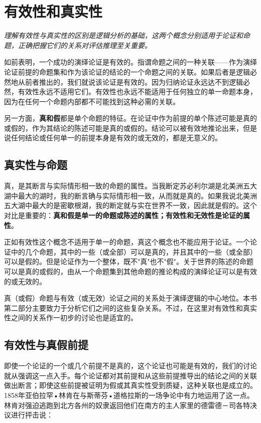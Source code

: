 \section{有效性和真实性}

\begin{logicbox}[title=引言]
\textit{理解有效性与真实性的区别是逻辑分析的基础，这两个概念分别适用于论证和命题，正确把握它们的关系对评估推理至关重要。}
\end{logicbox}

如前表明，一个成功的演绎论证是有效的。指谓命题之间的一种关联——作为演绎论证前提的命题集和作为该论证的结论的一个命题之间的关联。如果后者是逻辑必然地从前者推出的，我们就说该论证是有效的。因为归纳论证永远达不到逻辑必然，有效性永远不适用它们。有效性也永远不能适用于任何独立的单一命题本身，因为在任何一个命题内部都不可能找到这种必需的关联。

另一方面，\textbf{真和假}都是单个命题的特征。在论证中作为前提的单个陈述可能是真的或假的，作为其结论的陈述可能是真的或假的。结论可以被有效地推论出来，但是说任何结论或任何单一的前提本身是有效的或无效的，都是无意义的。

\subsection{真实性与命题}

真，是其断言与实际情形相一致的命题的属性。当我断定苏必利尔湖是北美洲五大湖中最大的湖时，我的断言确与实际情形相一致，从而就是真的。如果我说北美洲五大湖中最大的是密歇根湖，我的断定就与实在世界不一致，因此就是假的。这个对比是重要的：\textbf{真和假是单一的命题或陈述的属性；有效性和无效性是论证的属性}。

正如有效性这个概念不适用于单一的命题，真这个概念也不能应用于论证。一个论证中的几个命题，其中的一些（或全部）可以是真的，并且其中的一些（或全部）可以是假的。但是论证作为一个整体，既不"真"也不"假"。关于世界的陈述的命题可以是真的或假的，由从一个命题集到其他命题的推论构成的演绎论证可以是有效的或无效的。

真（或假）命题与有效（或无效）论证之间的关系处于演绎逻辑的中心地位。本书第二部分主要致力于分析它们之间的这些复杂关系。不过，在这里对有效性和真实性之间的关系作一初步的讨论也是适宜的。

\subsection{有效性与真假前提}

即使一个论证的一个或几个前提不是真的，这个论证也可能是有效的，我们的讨论就从强调这一点入手。每个论证都对其前提和从这些前提推导出的结论之间的关联做出断言；即使这些前提被证明为假或其真实性受到质疑，这种关联也是成立的。1858年亚伯拉罕•林肯在与斯蒂芬•道格拉斯的一场争论中有力地运用了这一点。林肯对强迫逃跑到北方各州的奴隶返回他们在南方的主人家里的德雷德－司各特决议进行抨击说：

